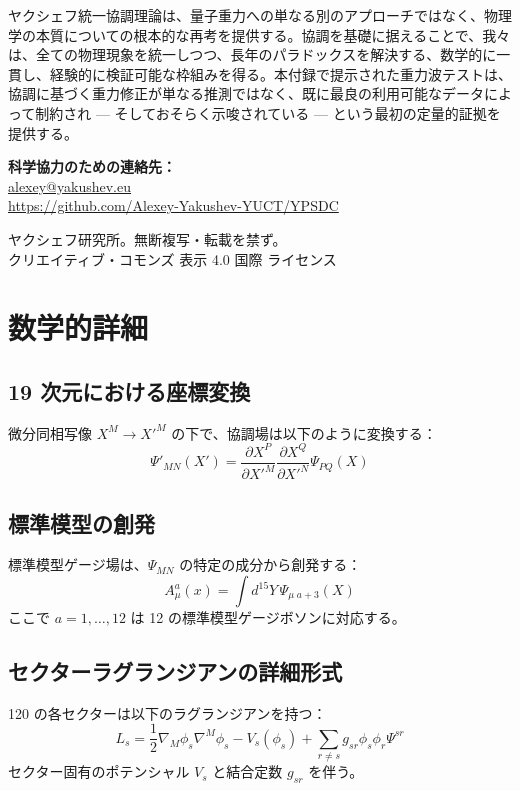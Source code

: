 \documentclass[11pt,a4paper]{article}
\theoremstyle{remark}
\begin{document}
	ヤクシェフ統一協調理論は、量子重力への単なる別のアプローチではなく、物理学の本質についての根本的な再考を提供する。協調を基礎に据えることで、我々は、全ての物理現象を統一しつつ、長年のパラドックスを解決する、数学的に一貫し、経験的に検証可能な枠組みを得る。本付録で提示された重力波テストは、協調に基づく重力修正が単なる推測ではなく、既に最良の利用可能なデータによって制約され — そしておそらく示唆されている — という最初の定量的証拠を提供する。
	
	\begin{center}
		\vspace{1cm}
		\textbf{科学協力のための連絡先：}\\
		\url{alexey@yakushev.eu}\\
		\url{https://github.com/Alexey-Yakushev-YUCT/YPSDC}
		
		\vspace{0.5cm}
		 ヤクシェフ研究所。無断複写・転載を禁ず。\\
		クリエイティブ・コモンズ 表示 4.0 国際 ライセンス
	\end{center}
	
	\appendix
	\section{数学的詳細}
	\label{app:math-details}
	
	\subsection{19 次元における座標変換}
	
	微分同相写像 $X^M \to X'^M$ の下で、協調場は以下のように変換する：
	\[
	\Psi'_{MN}(X') = \frac{\partial X^P}{\partial X'^M} \frac{\partial X^Q}{\partial X'^N} \Psi_{PQ}(X)
	\]
	
	\subsection{標準模型の創発}
	
	標準模型ゲージ場は、$\Psi_{MN}$ の特定の成分から創発する：
	\[
	A_\mu^a(x) = \int d^{15}Y \, \Psi_{\mu\;a+3}(X)
	\]
	ここで $a=1,\dots,12$ は 12 の標準模型ゲージボソンに対応する。
	
	\subsection{セクターラグランジアンの詳細形式}
	
	120 の各セクターは以下のラグランジアンを持つ：
	\[
	L_s = \frac{1}{2} \nabla_M \phi_s \nabla^M \phi_s - V_s(\phi_s) + \sum_{r \neq s} g_{sr} \phi_s \phi_r \Psi^{sr}
	\]
	セクター固有のポテンシャル $V_s$ と結合定数 $g_{sr}$ を伴う。
	
\end{document}
